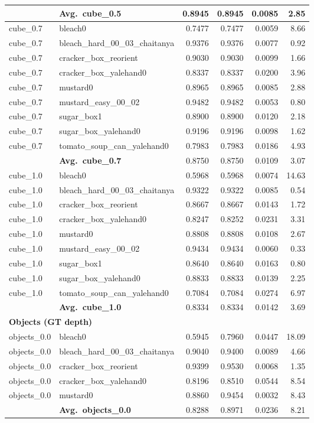 \begin{longtable}{llrrrr}
  & \textbf{Avg.~cube_0.5} & 0.8945 & 0.8945 & 0.0085 & 2.85 \\
  \midrule
  cube_0.7 & bleach0 & 0.7477 & 0.7477 & 0.0059 & 8.66 \\
  cube_0.7 & bleach\_hard\_00\_03\_chaitanya & 0.9376 & 0.9376 & 0.0077 & 0.92 \\
  cube_0.7 & cracker\_box\_reorient & 0.9030 & 0.9030 & 0.0099 & 1.66 \\
  cube_0.7 & cracker\_box\_yalehand0 & 0.8337 & 0.8337 & 0.0200 & 3.96 \\
  cube_0.7 & mustard0 & 0.8965 & 0.8965 & 0.0085 & 2.88 \\
  cube_0.7 & mustard\_easy\_00\_02 & 0.9482 & 0.9482 & 0.0053 & 0.80 \\
  cube_0.7 & sugar\_box1 & 0.8900 & 0.8900 & 0.0120 & 2.18 \\
  cube_0.7 & sugar\_box\_yalehand0 & 0.9196 & 0.9196 & 0.0098 & 1.62 \\
  cube_0.7 & tomato\_soup\_can\_yalehand0 & 0.7983 & 0.7983 & 0.0186 & 4.93 \\
  \cmidrule{2-6}
  & \textbf{Avg.~cube_0.7} & 0.8750 & 0.8750 & 0.0109 & 3.07 \\
  \midrule
  cube_1.0 & bleach0 & 0.5968 & 0.5968 & 0.0074 & 14.63 \\
  cube_1.0 & bleach\_hard\_00\_03\_chaitanya & 0.9322 & 0.9322 & 0.0085 & 0.54 \\
  cube_1.0 & cracker\_box\_reorient & 0.8667 & 0.8667 & 0.0143 & 1.72 \\
  cube_1.0 & cracker\_box\_yalehand0 & 0.8247 & 0.8252 & 0.0231 & 3.31 \\
  cube_1.0 & mustard0 & 0.8808 & 0.8808 & 0.0108 & 2.67 \\
  cube_1.0 & mustard\_easy\_00\_02 & 0.9434 & 0.9434 & 0.0060 & 0.33 \\
  cube_1.0 & sugar\_box1 & 0.8640 & 0.8640 & 0.0163 & 0.80 \\
  cube_1.0 & sugar\_box\_yalehand0 & 0.8833 & 0.8833 & 0.0139 & 2.25 \\
  cube_1.0 & tomato\_soup\_can\_yalehand0 & 0.7084 & 0.7084 & 0.0274 & 6.97 \\
  \cmidrule{2-6}
  & \textbf{Avg.~cube_1.0} & 0.8334 & 0.8334 & 0.0142 & 3.69 \\
  \midrule
\multicolumn{6}{l}{\textbf{Objects (GT depth)}} \\
\midrule
  objects_0.0 & bleach0 & 0.5945 & 0.7960 & 0.0447 & 18.09 \\
  objects_0.0 & bleach\_hard\_00\_03\_chaitanya & 0.9040 & 0.9400 & 0.0089 & 4.66 \\
  objects_0.0 & cracker\_box\_reorient & 0.9399 & 0.9530 & 0.0068 & 1.35 \\
  objects_0.0 & cracker\_box\_yalehand0 & 0.8196 & 0.8510 & 0.0544 & 8.54 \\
  objects_0.0 & mustard0 & 0.8860 & 0.9454 & 0.0032 & 8.43 \\
  \cmidrule{2-6}
  & \textbf{Avg.~objects_0.0} & 0.8288 & 0.8971 & 0.0236 & 8.21 \\
  \midrule
\bottomrule
\end{longtable}